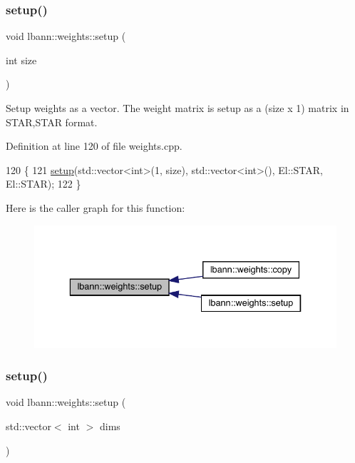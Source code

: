 \subsubsection{\texorpdfstring{setup()}{setup()}\hspace{0.1cm}{\footnotesize\ttfamily [1/4]}}
{\footnotesize\ttfamily void lbann\+::weights\+::setup (\begin{DoxyParamCaption}\item[{int}]{size }\end{DoxyParamCaption})\hspace{0.3cm}{\ttfamily [virtual]}}

Setup weights as a vector. The weight matrix is setup as a (size x 1) matrix in S\+T\+AR,S\+T\+AR format. 

Definition at line 120 of file weights.\+cpp.


\begin{DoxyCode}
120                             \{
121   \hyperlink{classlbann_1_1weights_a476989a30cbe62ab2f680235981c3ba5}{setup}(std::vector<int>(1, size), std::vector<int>(), El::STAR, El::STAR);
122 \}
\end{DoxyCode}
Here is the caller graph for this function\+:\nopagebreak
\begin{figure}[H]
\begin{center}
\leavevmode
\includegraphics[width=336pt]{classlbann_1_1weights_a476989a30cbe62ab2f680235981c3ba5_icgraph}
\end{center}
\end{figure}
\mbox{\label{classlbann_1_1weights_a64037919e22272a8931da328f0b2494a}} 
\subsubsection{\texorpdfstring{setup()}{setup()}\hspace{0.1cm}{\footnotesize\ttfamily [2/4]}}
{\footnotesize\ttfamily void lbann\+::weights\+::setup (\begin{DoxyParamCaption}\item[{std\+::vector$<$ int $>$}]{dims }\end{DoxyParamCaption})\hspace{0.3cm}{\ttfamily [virtual]}}

